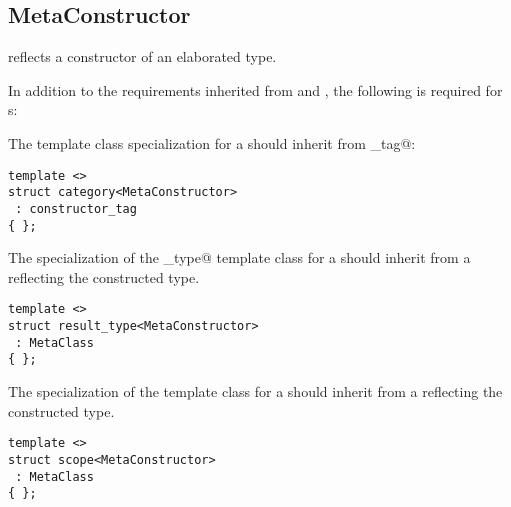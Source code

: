 \subsection{MetaConstructor}
\label{concept-MetaConstructor}

 reflects a constructor of an elaborated type.

In addition to the requirements inherited from  and ,
the following is required for s:

The \verb@category@ template class specialization for a  should
inherit from \verb@constructor_tag@:

\begin{verbatim}
template <>
struct category<MetaConstructor>
 : constructor_tag
{ };
\end{verbatim}

The specialization of the \verb@result_type@ template class for a  should
inherit from a  reflecting the constructed type.

\begin{verbatim}
template <>
struct result_type<MetaConstructor>
 : MetaClass
{ };
\end{verbatim}

The specialization of the \verb@scope@ template class for a  should
inherit from a  reflecting the constructed type.

\begin{verbatim}
template <>
struct scope<MetaConstructor>
 : MetaClass
{ };
\end{verbatim}

